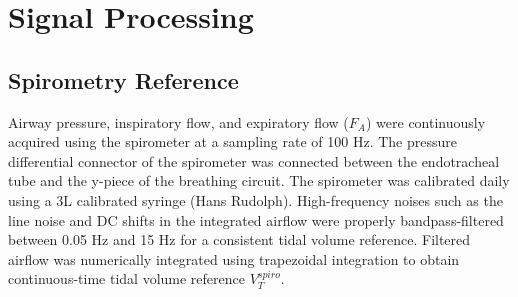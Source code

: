 \documentclass[journal]{IEEEtran}
\begin{document}
\section{Signal Processing}
\subsection{Spirometry Reference}
Airway pressure, inspiratory flow, and expiratory flow ($F_A$) were continuously acquired using the spirometer at a sampling rate of 100 Hz. The pressure differential connector of the spirometer was connected between the endotracheal tube and the y-piece of the breathing circuit. The spirometer was calibrated daily using a 3L calibrated syringe (Hans Rudolph). High-frequency noises such as the line noise and DC shifts in the integrated airflow were properly bandpass-filtered between 0.05 Hz and 15 Hz for a consistent tidal volume reference. Filtered airflow was numerically integrated using trapezoidal integration to obtain continuous-time tidal volume reference $V^{spiro}_T$. 
\end{document}
